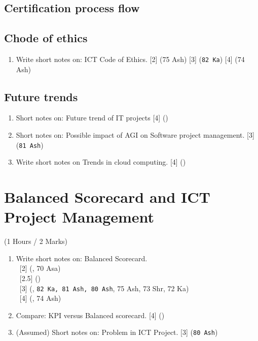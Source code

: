 \documentclass[12pt]{article}
\newcommand{\enter}{\\\textcolor{white}{1}}
\begin{document}
  \subsection{Certification process flow}
  \subsection{Chode of ethics}
    \begin{enumerate}
      \item Write short notes on: ICT Code of Ethics. \hfill [2] (75 Ash) [3] (\texttt{82 Ka}) [4] (74 Ash)
    \end{enumerate}

  \subsection{Future trends}
    \begin{enumerate}
        \item Short notes on: Future trend of IT projects \hfill [4] ()

        \item Short notes on: Possible impact of AGI on Software project management. \hfill [3] (\texttt{81 Ash})

        \item Write short notes on Trends in cloud computing. \hfill [4] ()
    \end{enumerate}

\pagebreak

\section{Balanced Scorecard and ICT Project Management}
  \begin{center}(1 Hours / 2 Marks)\end{center}

  \begin{enumerate}
    \item Write short notes on: Balanced Scorecard.
      \enter[2] (, 70 Asa)
      \enter[2.5] ()
      \enter[3] (, \texttt{82 Ka, 81 Ash, 80 Ash}, 75 Ash, 73 Shr, 72 Ka)
      \enter[4] (, 74 Ash)

    \item Compare: KPI versus Balanced scorecard. \hfill [4] ()


    \item (Assumed) Short notes on: Problem in ICT Project. \hfill [3] (\texttt{80 Ash})
  \end{enumerate}

\pagebreak
\end{document}
